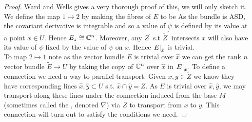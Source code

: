 \documentclass{article}
\begin{document}
\begin{proof}
	Ward and Wells \cite{Ward1991} gives a very thorough proof of this, we will only sketch it. \\
	We define the map $1 \mapsto 2$ by making the fibres of $E$ to be 
As the bundle is ASD, the covariant derivative is integrable and so a value of $\psi$ is defined by its value at a point $x\in U$. Hence $E_z \cong \mathbb{C}^n$. Moreover, any $Z^\prime$ s.t $\tilde{Z}^\prime$ intersects $x$ will also have its value of $\psi$ fixed by the value of $\psi$ on $x$. Hence $\left. E \right\rvert_{\hat{x}}$ is trivial. \\
To map $2 \mapsto 1$ note as the vector bundle $E$ is trivial over $\hat{x}$ we can get the rank $n$ vector bundle $\tilde{E} \to U$ by taking the copy of $\mathbb{C}^n$ over $\hat{x}$ in $\left. E \right\rvert_{\hat{x}}$. To define a connection we need a way to parallel transport. Given $x,y \in \tilde{Z}$ we know they have corresponding lines $\hat{x},\hat{y} \subset U$ s.t. $\hat{x} \cap \hat{y} = Z$. As $E$ is trivial over $\hat{x},\hat{y}$, we may transport along these lines under the connection induced from the base $M$ (sometimes called the , denoted $\nabla$) via $Z$ to transport from $x$ to $y$. This connection will turn out to satisfy the conditions we need. 
\end{proof}
\end{document}
